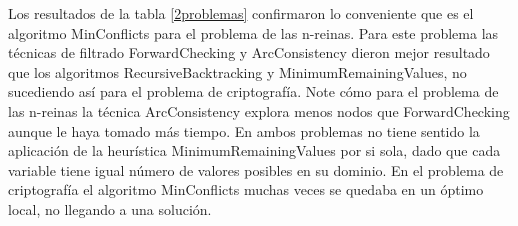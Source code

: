 Los resultados de la tabla \ref{2problemas} confirmaron lo conveniente que es el algoritmo \textsf{MinConflicts} para el problema de las n-reinas. Para este problema las t\'ecnicas de filtrado \textsf{ForwardChecking} y \textsf{ArcConsistency} dieron mejor resultado que los algoritmos \textsf{RecursiveBacktracking} y \textsf{MinimumRemainingValues}, no sucediendo as\'i para el problema de criptograf\'ia. Note c\'omo para el problema de las n-reinas la t\'ecnica \textsf{ArcConsistency} explora menos nodos que \textsf{ForwardChecking} aunque le haya tomado m\'as tiempo. En ambos problemas no tiene sentido la aplicaci\'on de la heur\'istica \textsf{MinimumRemainingValues} por si sola, dado que cada variable tiene igual n\'umero de valores posibles en su dominio. En el problema de criptograf\'ia el algoritmo \textsf{MinConflicts} muchas veces se quedaba en un \'optimo local, no llegando a una soluci\'on.

